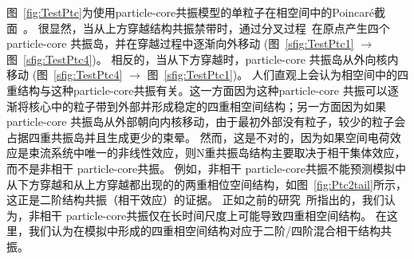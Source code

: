 图~\ref{fig:TestPtc}为使用particle-core共振模型的单粒子在相空间中的Poincar\'{e}截面~\cite{27,28}。
很显然，当从上方穿越结构共振禁带时，通过分叉过程~\cite{29,30}在原点产生四个particle-core 共振岛，并在穿越过程中逐渐向外移动
(图~\ref{sfig:TestPtc1} $\rightarrow$ 图~\ref{sfig:TestPtc4})。
相反的，当从下方穿越时，particle-core 共振岛从外向核内移动
(图~\ref{sfig:TestPtc4} $\rightarrow$ 图~\ref{sfig:TestPtc1})。
人们直观上会认为相空间中的四重结构与这种particle-core共振有关。这一方面因为这种particle-core 共振可以逐渐将核心中的粒子带到外部并形成稳定的四重相空间结构；另一方面因为如果particle-core 共振岛从外部朝向内核移动，由于最初外部没有粒子，较少的粒子会占据四重共振岛并且生成更少的束晕。
然而，这是不对的，因为如果空间电荷效应是束流系统中唯一的非线性效应，则N重共振岛结构主要取决于相干集体效应，而不是非相干 particle-core共振。
例如，非相干 particle-core共振不能预测模拟中从下方穿越和从上方穿越都出现的的两重相位空间结构，如图~\ref{fig:Ptc2tail}所示，
这正是二阶结构共振（相干效应）的证据。
正如之前的研究~\cite{17}所指出的，我们认为，非相干 particle-core共振仅在长时间尺度上可能导致四重相空间结构。
在这里，我们认为在模拟中形成的四重相空间结构对应于二阶/四阶混合相干结构共振。

